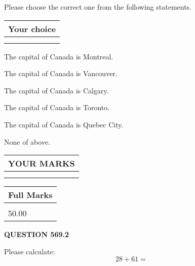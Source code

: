 \documentclass[12pt]{article}
\begin{document}
  
Please choose the correct one from the following statements.
  
  
\noindent\hspace{3.0in} \begin{tabular}{|l|}
\hline
Your choice \\
\hline
 \\ 
 \\ 
\hline
\end{tabular}
  
  
 
 
The capital of Canada is Montreal.
 
 
The capital of Canada is Vancouver.
 
 
The capital of Canada is Calgary.
 
 
The capital of Canada is Toronto.
 
 
The capital of Canada is Quebec City.
 
 
 None of above.
 
 
  
\vspace{0.2in}
  
\noindent\begin{tabular}{|l|}
\hline
 YOUR MARKS  \\
\hline
 \\ 
 \\ 
\hline
\end{tabular}
\hspace{0.05in} \begin{tabular}{|l|}
\hline
 Full Marks  \\
\hline
 \\ 
50.00 \\
\hline
\end{tabular}
{\textbf{\Large{QUESTION
569.2 
}}}
  
  
 
Please calculate:
\begin{equation}
28 +  %
61 = \nonumber
\end{equation}
 

 

 
   
   
 \vspace{0.2in}
 
   
   
   
   
\end{document}
